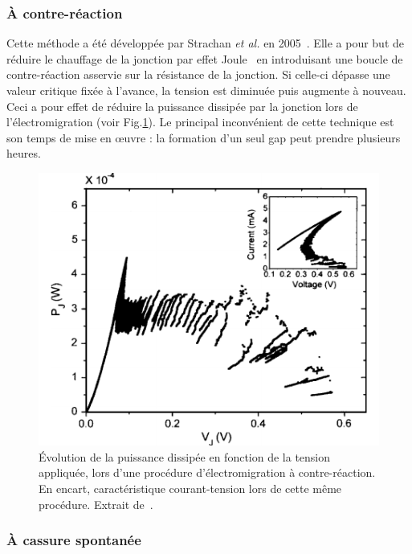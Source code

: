\subsubsection{À contre-réaction}
Cette méthode a été développée par Strachan \textit{et al.} en 2005~\cite{Strachan2005}. Elle a pour but de réduire le chauffage de la jonction par effet Joule~\cite{Esen2005} en introduisant une boucle de contre-réaction asservie sur la résistance de la jonction. Si celle-ci dépasse une valeur critique fixée à l'avance, la tension est diminuée puis augmente à nouveau. Ceci a pour effet de réduire la puissance dissipée par la jonction lors de l'électromigration (voir Fig.\ref{EseExemp}). Le principal inconvénient de cette technique est son temps de mise en œuvre : la formation d'un seul gap peut prendre plusieurs heures.


\begin{figure}
\parbox{7cm}{
\includegraphics[scale=0.45]{Fabrication/ElecMigExemp/EseFig.pdf} 
}
\parbox{6.5cm}{\caption{Évolution de la puissance dissipée en fonction de la tension appliquée, lors d'une procédure d'électromigration à contre-réaction. En encart, caractéristique courant-tension lors de cette m\^eme procédure. Extrait de~\cite{Esen2005}.}
\label{EseExemp}
}
\end{figure}


\subsubsection{À cassure spontanée}

